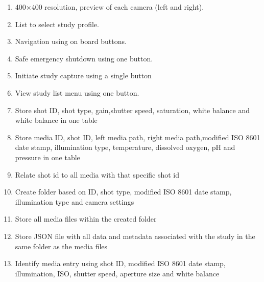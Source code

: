\begin{enumerate}
    \item 400$\times$400 resolution, preview of each camera (left and right).
    \item List to select study profile.
	\item Navigation using on board buttons.
	\item Safe emergency shutdown using one button.
	\item Initiate study capture using a single button
	\item View study list menu using one button.
	\item Store shot ID, shot type, gain,shutter speed, saturation, white balance and white balance in one table
	\item Store media ID, shot ID, left media path, right media path,modified ISO 8601 date stamp, illumination type, temperature, dissolved oxygen, pH and pressure in one table
	\item Relate shot id to all media with that specific shot id
	\item Create folder based on ID, shot type, modified ISO 8601 date stamp, illumination type and camera settings
	\item Store all media files within the created folder
	\item Store JSON file with all data and metadata associated with the study in the same folder as the media files
	\item Identify media entry using shot ID, modified ISO 8601 date stamp, illumination, ISO, shutter speed, aperture size and white balance
\end{enumerate}